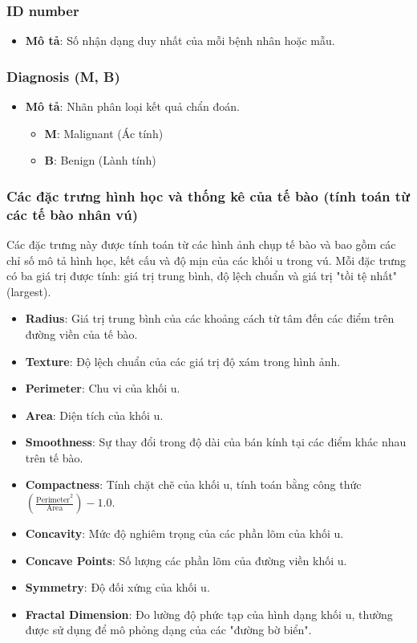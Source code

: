 \subsubsection*{ID number}
\begin{itemize}
    \item \textbf{Mô tả}: Số nhận dạng duy nhất của mỗi bệnh nhân hoặc mẫu.
\end{itemize}

\subsubsection*{Diagnosis (M, B)}
\begin{itemize}
    \item \textbf{Mô tả}: Nhãn phân loại kết quả chẩn đoán.
    \begin{itemize}
        \item \textbf{M}: Malignant (Ác tính)
        \item \textbf{B}: Benign (Lành tính)
    \end{itemize}
\end{itemize}

\subsubsection*{Các đặc trưng hình học và thống kê của tế bào (tính toán từ các tế bào nhân vú)}
Các đặc trưng này được tính toán từ các hình ảnh chụp tế bào và bao gồm các chỉ số mô tả hình học, kết cấu và độ mịn của các khối u trong vú. Mỗi đặc trưng có ba giá trị được tính: giá trị trung bình, độ lệch chuẩn và giá trị "tồi tệ nhất" (largest).

\begin{itemize}
    \item \textbf{Radius}: Giá trị trung bình của các khoảng cách từ tâm đến các điểm trên đường viền của tế bào.
    \item \textbf{Texture}: Độ lệch chuẩn của các giá trị độ xám trong hình ảnh.
    \item \textbf{Perimeter}: Chu vi của khối u.
    \item \textbf{Area}: Diện tích của khối u.
    \item \textbf{Smoothness}: Sự thay đổi trong độ dài của bán kính tại các điểm khác nhau trên tế bào.
    \item \textbf{Compactness}: Tính chặt chẽ của khối u, tính toán bằng công thức $\left(\frac{\text{Perimeter}^2}{\text{Area}}\right) - 1.0$.
    \item \textbf{Concavity}: Mức độ nghiêm trọng của các phần lõm của khối u.
    \item \textbf{Concave Points}: Số lượng các phần lõm của đường viền khối u.
    \item \textbf{Symmetry}: Độ đối xứng của khối u.
    \item \textbf{Fractal Dimension}: Đo lường độ phức tạp của hình dạng khối u, thường được sử dụng để mô phỏng dạng của các "đường bờ biển".
\end{itemize}

